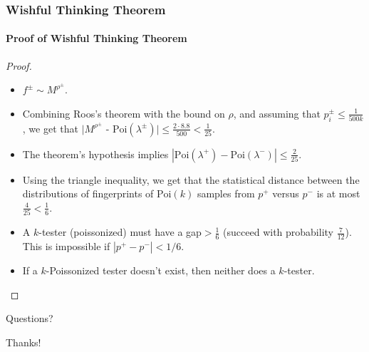 \documentclass[handout]{beamer}
\begin{document}
\begin{frame}
  \frametitle{Wishful Thinking Theorem} \framesubtitle{Proof of
    Wishful Thinking Theorem}  
    
    \begin{proof}
    \begin{itemize}
    \item<1-> $f^\pm\sim M^{\rho^\pm}$.
    \item<2-> Combining Roos's theorem with the bound on $\rho$, and
      assuming that $p_i^\pm\le\frac{1}{500k}$, we get that $|M^{\rho^\pm}$ -
      $\mbox{Poi}(\lambda^\pm)|\le \frac{2\cdot 8.8}{500}<\frac{1}{25}$.
    \item<3-> The theorem's hypothesis implies
      $|\mbox{Poi}(\lambda^+)-\mbox{Poi}(\lambda^-)|\le\frac{2}{25}$.
    \item<4-> Using the triangle inequality, we get that the
      statistical distance between the distributions of fingerprints
      of $\mbox{Poi}(k)$ samples from $p^+$ versus $p^-$ is at most
      $\frac{4}{25}<\frac{1}{6}$.
    \item<5-> A $k$-tester (poissonized) must have a gap$>\frac{1}{6}$
      (succeed with probability $\frac{7}{12}$). This is impossible if
      $|p^+-p^-|<1/6$.
    \item<6-> If a $k$-Poissonized tester doesn't exist, then neither
      does a $k$-tester.
    \end{itemize}
    \end{proof}
\end{frame}

\begin{frame}
  Questions?
\end{frame}

\begin{frame}
  Thanks!
\end{frame}
\end{document}

